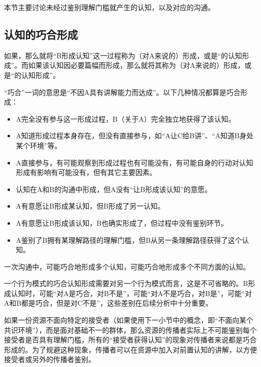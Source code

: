 \begin{explain}
本节主要讨论未经过鉴别理解门槛就产生的认知，以及对应的沟通。
\end{explain}
\subsection{认知的巧合形成}
如果，那么就将“B形成认知”这一过程称为（对A来说的）形成，或是“的认知形成”。而如果该认知因必要篇幅而形成，那么就将其称为（对A来说的）形成，或是“的认知形成”。
\begin{explain}
“巧合”一词的意思是“不因A具有讲解能力而达成”。以下几种情况都算是巧合形成：
\begin{itemize}
\item A完全没有参与这一形成过程，B（关于A）完全独立地获得了该认知。
\item A知道形成过程本身存在，但没有直接参与，如“A让C给B讲”、“A知道B身处某个环境”等。
\item A直接参与，有可能观察到形成过程也有可能没有，有可能自身的行动对认知形成有影响有可能没有，但有其它主要因素。
\item 认知在A和B的沟通中形成，但A没有“让B形成该认知”的意愿。
\item A有意愿让B形成某认知，但B形成了另一认知。
\item A有意愿让B形成该认知，B也确实形成了，但过程中没有鉴别环节。
\item A鉴别了B拥有某理解路径的理解门槛，但B从另一条理解路径获得了这个认知。
\end{itemize}
一次沟通中，可能巧合地形成多个认知，可能巧合地形成多个不同方面的认知。

一个行为模式的巧合认知形成需要对另一个行为模式而言，这是不可省略的。B形成认知时，可能“对A是巧合，对B不是”，可能“对A不是巧合，对B是”，可能“对A和B都是巧合，但是对C不是”，这些差别在后续分析中十分重要。

如果一份资源不面向特定的接受者（如果使用下一小节中的概念，即“不面向某个共识环境”），而是面对基础不一的群体，那么资源的传播者实际上不可能鉴别每个接受者是否具有理解门槛，所有的“接受者获得认知”的现象对传播者来说都是巧合形成的。为了规避这种现象，传播者可以在资源中加入对前置认知的讲解，以方便接受者或另外的传播者鉴别。
\end{explain}
